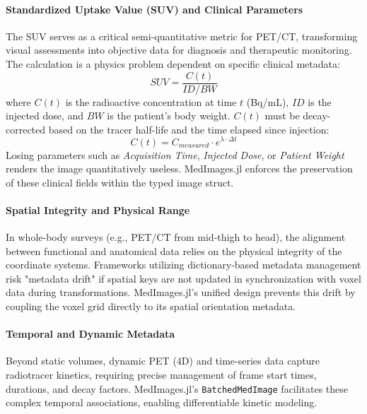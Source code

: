 \documentclass[10pt,letterpaper]{article}
\begin{document}
\paragraph{Standardized Uptake Value (SUV) and Clinical Parameters} 
The SUV serves as a critical semi-quantitative metric for PET/CT, transforming visual assessments into objective data for diagnosis and therapeutic monitoring. The calculation is a physics problem dependent on specific clinical metadata:
\begin{equation}
SUV = \frac{C(t)}{ID / BW}
\end{equation}
where $C(t)$ is the radioactive concentration at time $t$ (Bq/mL), $ID$ is the injected dose, and $BW$ is the patient's body weight. $C(t)$ must be decay-corrected based on the tracer half-life and the time elapsed since injection:
\begin{equation}
C(t) = C_{measured} \cdot e^{\lambda \cdot \Delta t}
\end{equation}
Losing parameters such as \textit{Acquisition Time}, \textit{Injected Dose}, or \textit{Patient Weight} renders the image quantitatively useless. MedImages.jl enforces the preservation of these clinical fields within the typed image struct.

\paragraph{Spatial Integrity and Physical Range} 
In whole-body surveys (e.g., PET/CT from mid-thigh to head), the alignment between functional and anatomical data relies on the physical integrity of the coordinate systems. Frameworks utilizing dictionary-based metadata management risk "metadata drift" if spatial keys are not updated in synchronization with voxel data during transformations. MedImages.jl's unified design prevents this drift by coupling the voxel grid directly to its spatial orientation metadata.

\paragraph{Temporal and Dynamic Metadata} 
Beyond static volumes, dynamic PET (4D) and time-series data capture radiotracer kinetics, requiring precise management of frame start times, durations, and decay factors. MedImages.jl's \texttt{BatchedMedImage} facilitates these complex temporal associations, enabling differentiable kinetic modeling.
\end{document}
